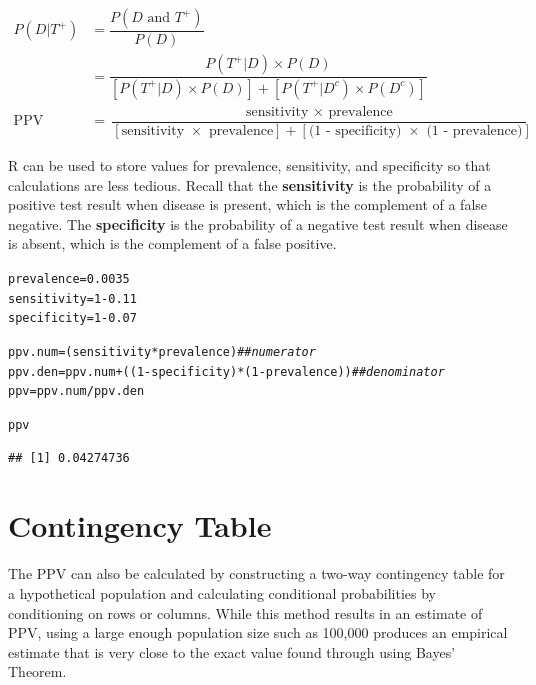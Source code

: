 \documentclass{report}\usepackage[]{graphicx}\usepackage[]{color}
\makeatletter
\newcommand{\hlnum}[1]{\textcolor[rgb]{0.686,0.059,0.569}{#1}}%
\newcommand{\hlcom}[1]{\textcolor[rgb]{0.678,0.584,0.686}{\textit{#1}}}%
\newcommand{\hlopt}[1]{\textcolor[rgb]{0,0,0}{#1}}%
\newcommand{\hlstd}[1]{\textcolor[rgb]{0.345,0.345,0.345}{#1}}%
\newcommand{\hlkwb}[1]{\textcolor[rgb]{0.69,0.353,0.396}{#1}}%
\newenvironment{kframe}{%
 \def\at@end@of@kframe{}%
 \ifinner\ifhmode%
  \def\at@end@of@kframe{\end{minipage}}%
  \begin{minipage}{\columnwidth}%
 \fi\fi%
 \def\FrameCommand##1{\hskip\@totalleftmargin \hskip-\fboxsep
 \colorbox{shadecolor}{##1}\hskip-\fboxsep
     \hskip-\linewidth \hskip-\@totalleftmargin \hskip\columnwidth}%
 \MakeFramed {\advance\hsize-\width
   \@totalleftmargin\z@ \linewidth\hsize
   \@setminipage}}%
 {\par\unskip\endMakeFramed%
 \at@end@of@kframe}
\newenvironment{knitrout}{}{} %
\makeatother
\begin{document}
\begin{align*}
P(D|T^{+}) &= \dfrac{P(D \text{ and } T^{+})}{P(D)} \\
&= \dfrac{P(T^{+}|D) \times P(D)}{[P(T^{+}|D) \times P(D)] + [P(T^{+}|D^c) \times P(D^c)]} \\
\text{PPV} &= \dfrac{\text{sensitivity } \times \text{ prevalence}}{[\text{sensitivity } \times \text{ prevalence}] + [\text{(1 - specificity) } \times \text{ (1 - prevalence)}]}
\end{align*}

\textsf{R} can be used to store values for prevalence, sensitivity, and specificity so that calculations are less tedious. Recall that the \textbf{sensitivity} is the probability of a positive test result when disease is present, which is the complement of a false negative. The \textbf{specificity} is the probability of a negative test result when disease is absent, which is the complement of a false positive.

\begin{knitrout}
\color{fgcolor}\begin{kframe}
\begin{alltt}
\hlstd{prevalence} \hlkwb{=} \hlnum{0.0035}
\hlstd{sensitivity} \hlkwb{=} \hlnum{1} \hlopt{-} \hlnum{0.11}
\hlstd{specificity} \hlkwb{=} \hlnum{1} \hlopt{-} \hlnum{0.07}

\hlstd{ppv.num} \hlkwb{=} \hlstd{(sensitivity}\hlopt{*}\hlstd{prevalence)}  \hlcom{## numerator}
\hlstd{ppv.den} \hlkwb{=} \hlstd{ppv.num} \hlopt{+} \hlstd{((}\hlnum{1}\hlopt{-}\hlstd{specificity)}\hlopt{*}\hlstd{(}\hlnum{1}\hlopt{-}\hlstd{prevalence))}  \hlcom{## denominator}
\hlstd{ppv} \hlkwb{=} \hlstd{ppv.num} \hlopt{/} \hlstd{ppv.den}

\hlstd{ppv}
\end{alltt}
\begin{verbatim}
## [1] 0.04274736
\end{verbatim}
\end{kframe}
\end{knitrout}


\section{Contingency Table}

The PPV can also be calculated by constructing a two-way contingency table for a hypothetical population and calculating conditional probabilities by conditioning on rows or columns. While this method results in an estimate of PPV, using a large enough population size such as 100,000 produces an empirical estimate that is very close to the exact value found through using Bayes' Theorem. 
\end{document}
